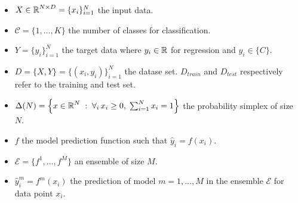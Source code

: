 \begin{itemize}
    \item $X \in \operatorname{\mathbb{R}}^{N \times D} = \{x_i\}_{i=1}^N$ the input data. 
    \item $\mathcal{C} = \{1,\ldots, K\}$ the number of classes for classification.
    \item $Y = \{y_i\}_{i=1}^N$ the target data where $y_i \in \operatorname{\mathbb{R}}$ for regression and $y_i \in \{C\}$.
    \item $D = \{X,Y\} = \{(x_i,y_i)\}_{i=1}^N  $ the datase set. $D_{train}$ and $D_{test}$ respectively refer to the training and test set.
    \item $\Delta(N) = \left\{ x \in \operatorname{\mathbb{R}}^N \;:\;\forall_i \, x_i \geq 0, \; \sum_{i=1}^N x_i = 1\right\}$ the probability simplex of size $N$.
    \item $f$ the model prediction function such that $\hat y_i = f(x_i)$.
    \item $\mathcal{E} = \{f^1, \ldots, f^M\}$ an ensemble of size $M$.
    \item $\hat y^m_i = f^m(x_i)$ the prediction of model $m = 1, \ldots, M$  in the ensemble $\mathcal{E}$ for data point $x_i$.

\end{itemize}